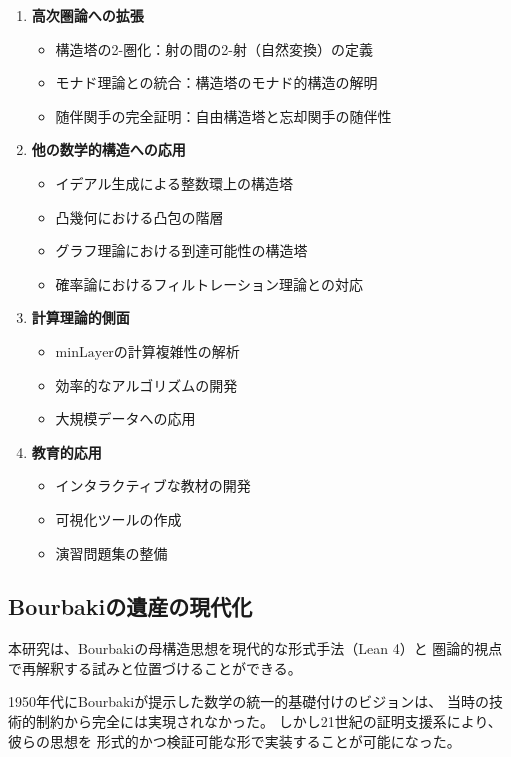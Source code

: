 \documentclass[a4paper,12pt]{ltjsarticle}
\theoremstyle{definition}
\begin{document}
\begin{enumerate}
\item \textbf{高次圏論への拡張}
  \begin{itemize}
  \item 構造塔の2-圏化：射の間の2-射（自然変換）の定義
  \item モナド理論との統合：構造塔のモナド的構造の解明
  \item 随伴関手の完全証明：自由構造塔と忘却関手の随伴性
  \end{itemize}

\item \textbf{他の数学的構造への応用}
  \begin{itemize}
  \item イデアル生成による整数環上の構造塔
  \item 凸幾何における凸包の階層
  \item グラフ理論における到達可能性の構造塔
  \item 確率論におけるフィルトレーション理論との対応
  \end{itemize}

\item \textbf{計算理論的側面}
  \begin{itemize}
  \item $\mathrm{minLayer}$の計算複雑性の解析
  \item 効率的なアルゴリズムの開発
  \item 大規模データへの応用
  \end{itemize}

\item \textbf{教育的応用}
  \begin{itemize}
  \item インタラクティブな教材の開発
  \item 可視化ツールの作成
  \item 演習問題集の整備
  \end{itemize}
\end{enumerate}

\subsection{Bourbakiの遺産の現代化}

本研究は、Bourbakiの母構造思想を現代的な形式手法（Lean 4）と
圏論的視点で再解釈する試みと位置づけることができる。

1950年代にBourbakiが提示した数学の統一的基礎付けのビジョンは、
当時の技術的制約から完全には実現されなかった。
しかし21世紀の証明支援系により、彼らの思想を
形式的かつ検証可能な形で実装することが可能になった。
\end{document}

